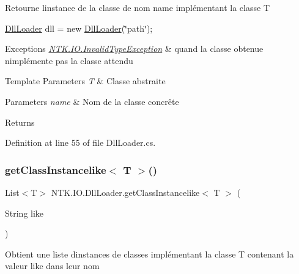 Retourne l\textquotesingle{}instance de la classe de nom {\ttfamily name} implémentant la classe T 

{\ttfamily  \mbox{\hyperlink{class_n_t_k_1_1_i_o_1_1_dll_loader}{Dll\+Loader}} dll = new \mbox{\hyperlink{class_n_t_k_1_1_i_o_1_1_dll_loader}{Dll\+Loader}}(\char`\"{}path\char`\"{}); } 
\begin{DoxyExceptions}{Exceptions}
{\em \mbox{\hyperlink{class_n_t_k_1_1_i_o_1_1_invalid_type_exception}{N\+T\+K.\+I\+O.\+Invalid\+Type\+Exception}}} & quand la classe obtenue n\textquotesingle{}implémente pas la classe attendu\\
\hline
\end{DoxyExceptions}

\begin{DoxyTemplParams}{Template Parameters}
{\em T} & Classe abstraite\\
\hline
\end{DoxyTemplParams}

\begin{DoxyParams}{Parameters}
{\em name} & Nom de la classe concrête\\
\hline
\end{DoxyParams}
\begin{DoxyReturn}{Returns}

\end{DoxyReturn}


Definition at line 55 of file Dll\+Loader.\+cs.

\mbox{\label{class_n_t_k_1_1_i_o_1_1_dll_loader_a6dc532c035af23d0bbcb057dcdc9482b}} 
\subsubsection{\texorpdfstring{getClassInstancelike$<$ T $>$()}{getClassInstancelike< T >()}}
{\footnotesize\ttfamily List$<$T$>$ N\+T\+K.\+I\+O.\+Dll\+Loader.\+get\+Class\+Instancelike$<$ T $>$ (\begin{DoxyParamCaption}\item[{String}]{like }\end{DoxyParamCaption})}



Obtient une liste d\textquotesingle{}instances de classes implémentant la classe T contenant la valeur like dans leur nom 

